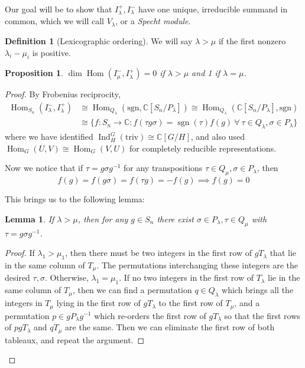 \documentclass[11pt]{article}
\newtheorem{prop}{Proposition}
\newtheorem{lem}{Lemma}
\theoremstyle{definition}
\newtheorem{defn}{Definition}
\newcommand{\C}{\mathbb C}
\newcommand{\Ind}{\operatorname{Ind}}
\newcommand{\Hom}{\operatorname{Hom}}
\newcommand{\sgn}{\operatorname{sgn}}
\begin{document}
Our goal will be to show that $I_{\lambda}^+, I_{\lambda}^-$ have one unique,
irreducible summand in common, which we will call $V_{\lambda}$, or a
\textit{Specht module}.

\begin{defn}[Lexicographic ordering]
We will say $\lambda > \mu$ if the first nonzero $\lambda_i - \mu_i$ is positive.
\end{defn}

\begin{prop}
$\dim \Hom(I_\mu^-, I_{\lambda}^+) = 0$ if $\lambda > \mu$ and 1 if $\lambda = \mu$.
\end{prop}

\begin{proof}
  By Frobenius reciprocity,
  \begin{align}
    \Hom_{S_n}(I^{-}_{\lambda}, I^+_{\lambda}) &\cong \Hom_{Q_\lambda}(\mathrm{sgn}, \mathbb C[S_n/P_{\lambda}]) \cong \Hom_{Q_{\lambda}}(\mathbb C[S_n/P_\lambda], \mathrm{sgn}) \\
    &\cong \{f:S_n \to \C : f(\tau g\sigma) = \sgn(\tau)f(g) \ \forall \ \tau \in Q_\lambda, \sigma \in P_\lambda\}
  \end{align}
  where we have identified $\Ind_H^G(\mathrm{triv}) \cong \mathbb C[G/ H]$, and
  also used $\Hom_G(U, V) \cong \Hom_G(V, U)$ for completely reducible
  representations.

  Now we notice that if $\tau  = g\sigma g^{-1}$ for any transpositions $\tau
  \in Q_\mu, \sigma \in P_{\lambda}$, then
  \begin{equation}
  f(g) = f(g\sigma) = f(\tau g) = -f(g) \implies f(g) = 0
  \end{equation}

  This brings us to the following lemma:

  \begin{lem}
    If $\lambda > \mu$, then for any $g \in S_n$ there exist $\sigma \in
    P_\lambda, \tau \in Q_{\mu}$ with $\tau = g\sigma g^{-1}$.
  \end{lem}

  \begin{proof}
    If $\lambda_1 > \mu_1$, then there must be two integers in the first row of
    $gT_\lambda$ that lie in the same column of $T_{\mu}$. The permutations
    interchanging these integers are the 
    desired $\tau, \sigma$. Otherwise, $\lambda_1 = \mu_1$. If no two integers
    in the first row of $T_\lambda$ lie in the same column of $T_\mu$, then we
    can find a permutation $q \in Q_\lambda$ which brings all the integers in
    $T_\mu$ lying in the first row of $gT_\lambda$ to the first row of
    $T_{\mu}$, and a permutation $p \in gP_\lambda g^{-1}$ which re-orders the
    first row of $gT_\lambda$ so that the first rows of $pgT_\lambda$ and
    $qT_\mu$ are the same. Then we can eliminate the first row of both tableaux, and
    repeat the argument.
  \end{proof}


\end{proof}
\end{document}
